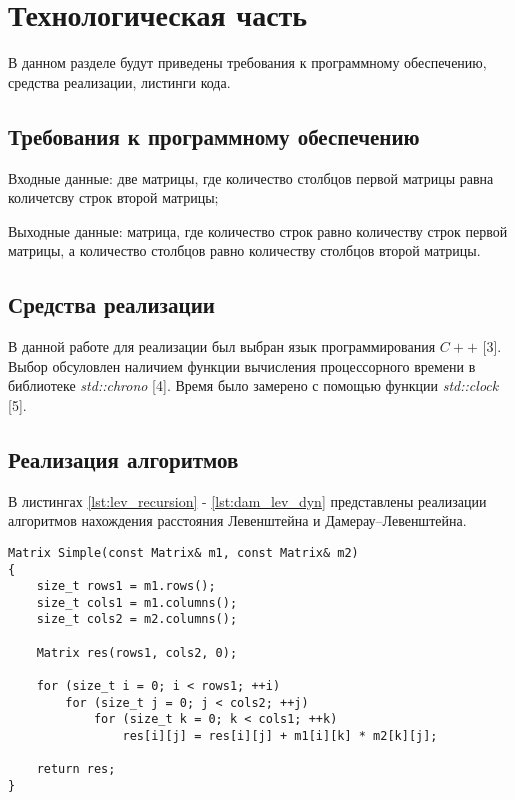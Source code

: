 \chapter{Технологическая часть}

В данном разделе будут приведены требования к программному обеспечению, средства реализации, листинги кода.

\section{Требования к программному обеспечению}

Входные данные: две матрицы, где количество столбцов первой матрицы равна количетсву строк второй матрицы;

Выходные данные: матрица, где количество строк равно количеству строк первой матрицы, а количество столбцов равно количеству столбцов второй матрицы.

\section{Средства реализации}
В данной работе для реализации был выбран язык программирования $C++$ [3]. Выбор обсуловлен наличием функции вычисления процессорного времени в библиотеке \textit{std::chrono} [4]. Время было замерено с помощью функции \textit{std::clock} [5].

\section{Реализация алгоритмов}

В листингах \ref{lst:lev_recursion} - \ref{lst:dam_lev_dyn} представлены реализации алгоритмов нахождения расстояния Левенштейна и Дамерау–Левенштейна.

\clearpage

\begin{center}
\captionsetup{justification=raggedright,singlelinecheck=off}
\begin{lstlisting}[label=lst:lev_recursion,caption=Классический алгоритм]
Matrix Simple(const Matrix& m1, const Matrix& m2)
{
    size_t rows1 = m1.rows();
    size_t cols1 = m1.columns();
    size_t cols2 = m2.columns();

    Matrix res(rows1, cols2, 0);

    for (size_t i = 0; i < rows1; ++i)
        for (size_t j = 0; j < cols2; ++j)
            for (size_t k = 0; k < cols1; ++k)
                res[i][j] = res[i][j] + m1[i][k] * m2[k][j];

    return res;
}
\end{lstlisting}
\end{center}


